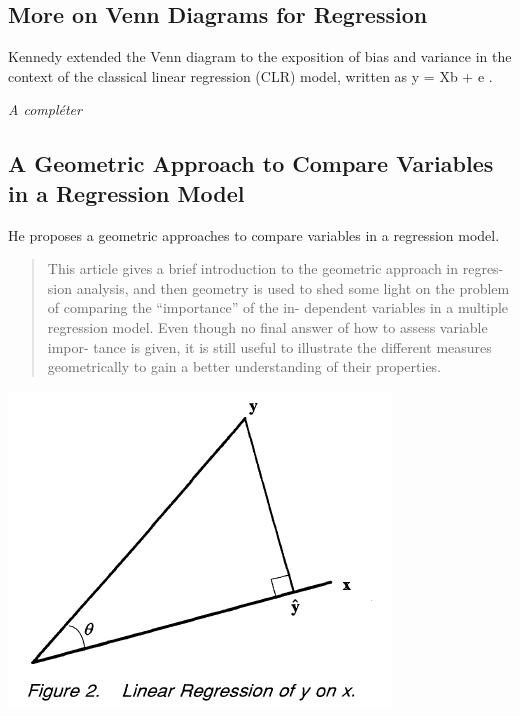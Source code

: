 \documentclass[
]{report}
\begin{document}
\hypertarget{more-on-venn-diagrams-for-regression}{%
\subsection{More on Venn Diagrams for Regression}\label{more-on-venn-diagrams-for-regression}}

Kennedy \citep{kennedy} extended the Venn diagram to the exposition of bias and variance in the context of the classical linear regression (CLR) model, written as y = Xb + e .

\emph{A compléter}

\hypertarget{a-geometric-approach-to-compare-variables-in-a-regression-model}{%
\subsection{A Geometric Approach to Compare Variables in a Regression Model}\label{a-geometric-approach-to-compare-variables-in-a-regression-model}}

He proposes \citep{Bring} a geometric approaches to compare variables in a regression model.

\begin{quote}
This article gives a brief introduction to the geometric approach in regres- sion analysis, and then geometry is used to shed some light on the problem of comparing the ``importance'' of the in- dependent variables in a multiple regression model. Even though no final answer of how to assess variable impor- tance is given, it is still useful to illustrate the different measures geometrically to gain a better understanding of their properties.
\end{quote}

\includegraphics{bring1.PNG}
\end{document}
